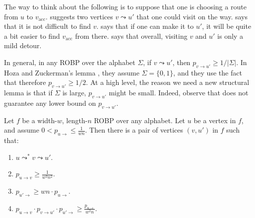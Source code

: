 \documentclass{toc}
\begin{document}
The way to think about the following  is to suppose that one is choosing a route from $u$ to $v_{\text{acc}}$.  suggests two vertices $v \leadsto u'$ that one could visit on the way.  says that it is not difficult to find $v$.  says that if one can make it to $u'$, it will be quite a bit easier to find $v_{\text{acc}}$ from there.  says that overall, visiting $v$ and $u'$ is only a mild detour.

In general, in any ROBP over the alphabet $\Sigma$, if $v \leadsto u'$, then $p_{v \to u'} \geq 1/|\Sigma|$. In Hoza and Zuckerman's lemma \cite[Lemma 1]{HZ20}, they assume $\Sigma = \{0, 1\}$, and they use the fact that therefore $p_{v \to u'} \geq 1/2$. At a high level, the reason we need a new structural lemma is that if $\Sigma$ is large, $p_{v \to u'}$ might be small. Indeed, observe that  does not guarantee any lower bound on $p_{v \to u'}$.

\begin{lemma} \label{lem:structural}
Let $f$ be a width-$w$, length-$n$ ROBP over any alphabet. Let $u$ be a vertex in $f$, and assume $0 < p_{u \to} \leq \frac{1}{wn}$. Then there is a pair of vertices $(v, u')$ in $f$ such that:
\begin{enumerate}
\item $u \leadsto^* v \leadsto u'$. \label{item:preceding}
\item $p_{u \to v} \geq \frac{1}{w^3 n^2}$. \label{item:noticeable}
\item $p_{u' \to} \geq wn \cdot p_{u \to}$. \label{item:improvement}
\item $p_{u \to v} \cdot p_{v \to u'} \cdot p_{u' \to} \geq \frac{p_{u \to}}{w^2 n}$. \label{item:chain}
\end{enumerate}
\end{lemma}
\end{document}
